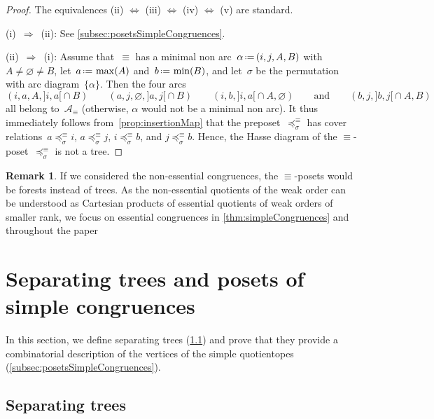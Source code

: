 \documentclass{amsart}
\theoremstyle{definition}
\newtheorem{remark}[theorem]{Remark}
\newcommand{\eqdef}{\mbox{\,\raisebox{0.2ex}{\scriptsize\ensuremath{\mathrm:}}\ensuremath{=}\,}} %
\newcommand{\arcs}{{\mathcal{A}}} %
\begin{document}
\begin{proof}
The equivalences (ii) $\iff$ (iii) $\iff$ (iv) $\iff$ (v) are standard.

(i)~$\Longrightarrow$~(ii): See \cref{subsec:posetsSimpleCongruences}.

(ii)~$\Longrightarrow$~(i): Assume that~$\equiv$ has a minimal non arc~$\alpha \eqdef (i, j, A, B)$ with~$A \ne \varnothing \ne B$, let~$a \eqdef \max(A)$ and~$b \eqdef \min(B)$, and let~$\sigma$ be the permutation with arc diagram~$\{\alpha\}$. Then the four arcs
\[
(i, a, A, {]i,a[} \cap B)
\qquad
(a, j, \varnothing, {]a,j[} \cap B)
\qquad
(i, b, {]i,a[} \cap A, \varnothing)
\qquad\text{and}\qquad
(b, j, {]b,j[} \cap A, B)
\]
all belong to~$\arcs_\equiv$ (otherwise, $\alpha$ would not be a minimal non arc).
It thus immediately follows from~\cref{prop:insertionMap} that the preposet~$\preccurlyeq_\sigma^\equiv$ has cover relations~$a \preccurlyeq_\sigma^\equiv i$, $a \preccurlyeq_\sigma^\equiv j$, $i \preccurlyeq_\sigma^\equiv b$, and $j \preccurlyeq_\sigma^\equiv b$.
Hence, the Hasse diagram of the $\equiv$-poset~$\preccurlyeq_\sigma^\equiv$ is not a tree.
\end{proof}

\begin{remark}
If we considered the non-essential congruences, the $\equiv$-posets would be forests instead of trees.
As the non-essential quotients of the weak order can be understood as Cartesian products of essential quotients of weak orders of smaller rank, we focus on essential congruences in \cref{thm:simpleCongruences} and throughout the paper
\end{remark}


\section{Separating trees and posets of simple congruences}
\label{sec:separatingTreesPosetsSimpleCongruences}

In this section, we define separating trees (\cref{subsec:separatingTrees}) and prove that they provide a combinatorial description of the vertices of the simple quotientopes (\cref{subsec:posetsSimpleCongruences}).


\subsection{Separating trees}
\label{subsec:separatingTrees}
\end{document}
